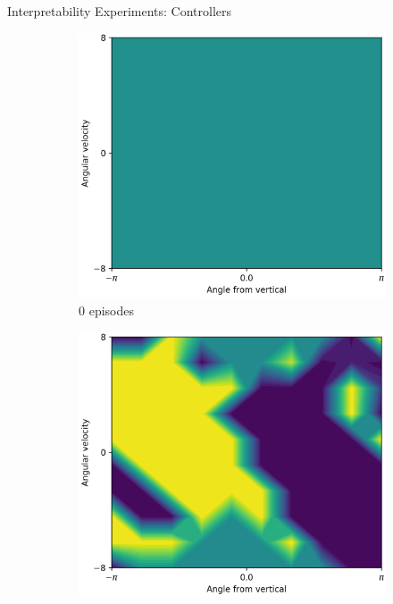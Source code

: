\documentclass{beamer}
\begin{document}
\begin{frame}{Interpretability Experiments: Controllers}
  \begin{figure}[t]
    \centering
    \begin{subfigure}{0.30\linewidth}
      \centering
      \includegraphics[width=0.9\linewidth,trim=0 0 0 0,clip]{assets/ref_plots/controller_refcolexps_r10c10_1_ep0}
      \caption{0 episodes}
    \end{subfigure}
    \begin{subfigure}{0.30\linewidth}
      \centering
      \includegraphics[width=0.9\linewidth,trim=0 0 0 0,clip]{assets/ref_plots/controller_refcolexps_r10c10_1_ep1000}

\end{subfigure}
\end{figure}
\end{frame}
\end{document}
